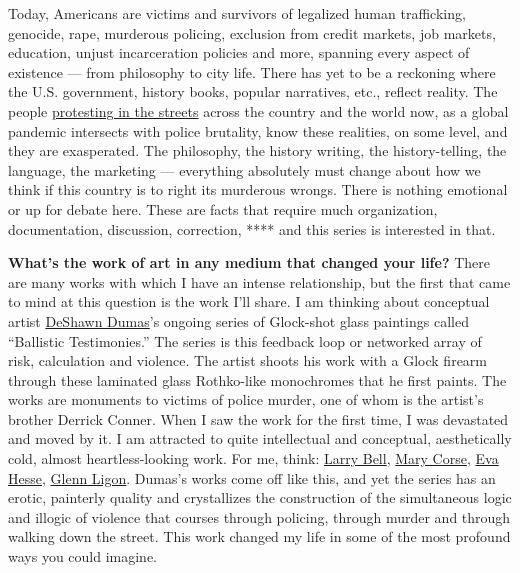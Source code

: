 Today, Americans are victims and survivors of legalized human
trafficking, genocide, rape, murderous policing, exclusion from credit
markets, job markets, education, unjust incarceration policies and more,
spanning every aspect of existence --- from philosophy to city life.
There has yet to be a reckoning where the U.S. government, history
books, popular narratives, etc., reflect reality. The people
\href{https://www.nytimes.com/interactive/2020/07/03/us/george-floyd-protests-crowd-size.html}{protesting
in the streets} across the country and the world now, as a global
pandemic intersects with police brutality, know these realities, on some
level, and they are exasperated. The philosophy, the history writing,
the history-telling, the language, the marketing --- everything
absolutely must change about how we think if this country is to right
its murderous wrongs. There is nothing emotional or up for debate here.
These are facts that require much organization, documentation,
discussion, correction, **** and this series is interested in that.

\textbf{What's the work of art in any medium that changed your life?}
There are many works with which I have an intense relationship, but the
first that came to mind at this question is the work I'll share. I am
thinking about conceptual artist
\href{http://www.deshawndumas.com/}{DeShawn Dumas}'s ongoing series of
Glock-shot glass paintings called ``Ballistic Testimonies.'' The series
is this feedback loop or networked array of risk, calculation and
violence. The artist shoots his work with a Glock firearm through these
laminated glass Rothko-like monochromes that he first paints. The works
are monuments to victims of police murder, one of whom is the artist's
brother Derrick Conner. When I saw the work for the first time, I was
devastated and moved by it. I am attracted to quite intellectual and
conceptual, aesthetically cold, almost heartless-looking work. For me,
think:
\href{https://www.nytimes.com/2018/06/15/t-magazine/mary-heilmann-larry-bell-conversation.html}{Larry
Bell},
\href{https://tmagazine.blogs.nytimes.com/2012/02/24/artifacts-mary-corse/}{Mary
Corse},
\href{https://tmagazine.blogs.nytimes.com/2010/03/25/just-looking-eva-hesse/}{Eva
Hesse},
\href{https://www.nytimes.com/2018/06/18/t-magazine/glenn-ligon-adrian-piper-art.html}{Glenn
Ligon}. Dumas's works come off like this, and yet the series has an
erotic, painterly quality and crystallizes the construction of the
simultaneous logic and illogic of violence that courses through
policing, through murder and through walking down the street. This work
changed my life in some of the most profound ways you could imagine.

